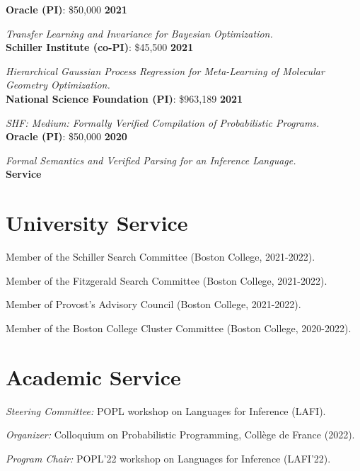 \documentclass[margin,line]{res}
\begin{document}
\begin{resume}
{\bf Oracle (PI)}: \$50,000 \hfill {\bf 2021}
\vspace{-.4cm}

{\em Transfer Learning and Invariance for Bayesian Optimization.} \\

{\bf Schiller Institute (co-PI)}: \$45,500 \hfill {\bf 2021}
\vspace{-.4cm}

{\em Hierarchical Gaussian Process Regression for Meta-Learning of Molecular Geometry Optimization.} \\

{\bf National Science Foundation (PI)}: \$963,189  \hfill {\bf 2021}
\vspace{-.4cm}

{\em SHF: Medium: Formally Verified Compilation of Probabilistic Programs.}\\

{\bf Oracle (PI)}: \$50,000 \hfill {\bf 2020}
\vspace{-.4cm}

{\em Formal Semantics and Verified Parsing for an Inference Language.} \\

\newpage
  {\bf {\Large Service}}

\section{\sc University Service}

Member of the Schiller Search Committee (Boston College, 2021-2022).

Member of the Fitzgerald Search Committee (Boston College, 2021-2022).

Member of Provost's Advisory Council (Boston College, 2021-2022).

Member of the Boston College Cluster Committee (Boston College, 2020-2022).

\section{\sc Academic Service}

{\em Steering Committee:} POPL workshop on Languages for Inference (LAFI).

{\em Organizer:} Colloquium on Probabilistic Programming, Coll\`ege de France (2022).

{\em Program Chair:} POPL'22 workshop on Languages for Inference (LAFI'22).


\end{resume}
\end{document}
